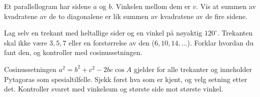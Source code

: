 
Et parallellogram har sidene $a$ og $b$. Vinkelen mellom dem er $v$. Vis at summen av kvadratene av de to diagonalene er lik summen av kvadratene av de fire sidene.\par\smallskip
{}

Lag selv en trekant med heltallige sider og en vinkel på nøyaktig $120^\circ$. Trekanten skal ikke være $3, 5, 7$ eller en forstørrelse av den ($6, 10, 14, \ldots$).
Forklar hvordan du fant den, og kontroller med cosinussetningen.

\begin{oppsummering}
Cosinussetningen $a^2 = b^2 + c^2 - 2bc\cos A$ gjelder for alle trekanter og inneholder Pytagoras som spesialtilfelle.
Sjekk først hva som er kjent, og velg setning etter det. Kontroller svaret med vinkelsum og største side mot største vinkel.
\end{oppsummering}
